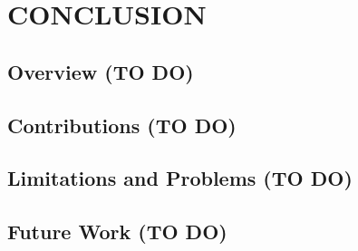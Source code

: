 \chapter{CONCLUSION}
\label{ch:conclusion}

\section{Overview (TO DO)}

\section{Contributions (TO DO)}

\section{Limitations and Problems (TO DO)}

\section{Future Work (TO DO)}
